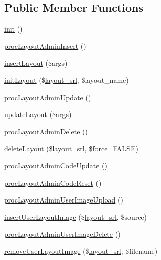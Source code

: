 \subsection*{Public Member Functions}
\begin{DoxyCompactItemize}
\item 
\hyperlink{classlayoutAdminController_ac71d304730d23b80b6c98f547d11226c}{init} ()
\item 
\hyperlink{classlayoutAdminController_aa80e244c2f02d0c46c6bee2f5921f4aa}{proc\+Layout\+Admin\+Insert} ()
\item 
\hyperlink{classlayoutAdminController_ada932b56411405c661fe90802921bc0c}{insert\+Layout} (\$args)
\item 
\hyperlink{classlayoutAdminController_ac98297f3c4d126154519bf9feb3a65f6}{init\+Layout} (\$\hyperlink{ko_8install_8php_a70054876db09b2519a1726663c8dd9e7}{layout\+\_\+srl}, \$layout\+\_\+name)
\item 
\hyperlink{classlayoutAdminController_a897057011913af6cb2740d8460544119}{proc\+Layout\+Admin\+Update} ()
\item 
\hyperlink{classlayoutAdminController_a7eec8ee6d2626ef89b08eb67af6638de}{update\+Layout} (\$args)
\item 
\hyperlink{classlayoutAdminController_a4a394a3902b03d0e7454f3b5047c1d5e}{proc\+Layout\+Admin\+Delete} ()
\item 
\hyperlink{classlayoutAdminController_a2e6e041059b08e3050ebf0f9fd0630bb}{delete\+Layout} (\$\hyperlink{ko_8install_8php_a70054876db09b2519a1726663c8dd9e7}{layout\+\_\+srl}, \$force=F\+A\+L\+SE)
\item 
\hyperlink{classlayoutAdminController_ac261704e4541f3696a37f4e080b059d2}{proc\+Layout\+Admin\+Code\+Update} ()
\item 
\hyperlink{classlayoutAdminController_a8e57e33b0b177381e53943d8e8230e71}{proc\+Layout\+Admin\+Code\+Reset} ()
\item 
\hyperlink{classlayoutAdminController_a8883afdc3e36df910ff5c950d94f5919}{proc\+Layout\+Admin\+User\+Image\+Upload} ()
\item 
\hyperlink{classlayoutAdminController_acf8d291755db711c0d6fe4209154a998}{insert\+User\+Layout\+Image} (\$\hyperlink{ko_8install_8php_a70054876db09b2519a1726663c8dd9e7}{layout\+\_\+srl}, \$source)
\item 
\hyperlink{classlayoutAdminController_a91dcd0368a7a3f85b2047d0d2546f14b}{proc\+Layout\+Admin\+User\+Image\+Delete} ()
\item 
\hyperlink{classlayoutAdminController_a57ce8eb7e45c237bc9f20b2a2b9576c0}{remove\+User\+Layout\+Image} (\$\hyperlink{ko_8install_8php_a70054876db09b2519a1726663c8dd9e7}{layout\+\_\+srl}, \$filename)

\end{DoxyCompactItemize}
